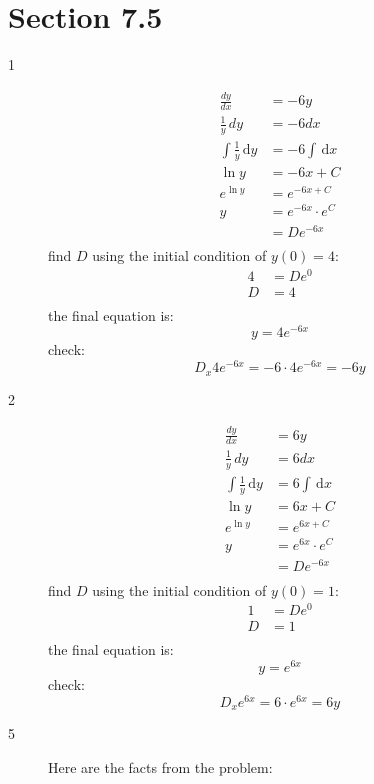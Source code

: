 \documentclass{exam}
\begin{document}
\section{Section 7.5}
\begin{description}

\item[1]
\begin{align*}
  \frac{dy}{dx} &= -6y \\
  \frac{1}{y} \, dy &= -6 dx \\
  \int \frac{1}{y} \, \mathrm{d}y &= -6 \int  \, \mathrm{d}x \\
  \ln y &= -6x + C \\
  e^{\ln y} &= e^{-6x + C} \\
  y &= e^{-6x} \cdot e^C \\
    &= D e^{-6x} \\
\end{align*}
find $D$ using the initial condition of $y(0) = 4$:
\begin{align*}
  4 &= D e^0 \\
  D &= 4 \\
\end{align*}
the final equation is:
\[
  y = 4e^{-6x}
\]
check:
\[
  D_x 4e^{-6x} = -6 \cdot 4 e^{-6x} = -6 y
\]

\item[2]
\begin{align*}
  \frac{dy}{dx} &= 6y \\
  \frac{1}{y} \, dy &= 6 dx \\
  \int \frac{1}{y} \, \mathrm{d}y &= 6 \int  \, \mathrm{d}x \\
  \ln y &= 6x + C \\
  e^{\ln y} &= e^{6x + C} \\
  y &= e^{6x} \cdot e^C \\
    &= D e^{-6x} \\
\end{align*}
find $D$ using the initial condition of $y(0) = 1$:
\begin{align*}
  1 &= D e^0 \\
  D &= 1 \\
\end{align*}
the final equation is:
\[
  y = e^{6x}
\]
check:
\[
  D_x e^{6x} = 6 \cdot e^{6x} = 6y
\]

\item[5]
Here are the facts from the problem:


\end{description}
\end{document}
